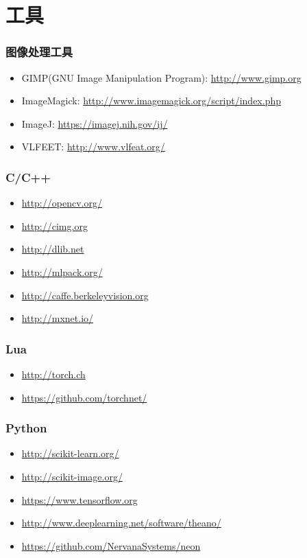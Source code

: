 \documentclass{beamer}
\begin{document}
\section{工具}
\label{sec-5}
\begin{frame}
\frametitle{图像处理工具}
\label{sec-5-1}

\begin{itemize}
\item GIMP(GNU Image Manipulation Program):  \href{http://www.gimp.org}{http://www.gimp.org}
\item ImageMagick:  \href{http://www.imagemagick.org/script/index.php}{http://www.imagemagick.org/script/index.php}
\item ImageJ:   \href{https://imagej.nih.gov/ij/}{https://imagej.nih.gov/ij/}
\item VLFEET: \href{http://www.vlfeat.org/}{http://www.vlfeat.org/}
\end{itemize}
\end{frame}
\begin{frame}
\frametitle{C/C++}
\label{sec-5-2}

\begin{itemize}
\item \href{http://opencv.org/}{http://opencv.org/}
\item \href{http://cimg.org}{http://cimg.org}
\item \href{http://dlib.net}{http://dlib.net}
\item \href{http://mlpack.org/}{http://mlpack.org/}
\item \href{http://caffe.berkeleyvision.org}{http://caffe.berkeleyvision.org}
\item \href{http://mxnet.io/}{http://mxnet.io/}
\end{itemize}
\end{frame}
\begin{frame}
\frametitle{Lua}
\label{sec-5-3}

\begin{itemize}
\item \href{http://torch.ch}{http://torch.ch}
\item \href{https://github.com/torchnet/}{https://github.com/torchnet/}
\end{itemize}
\end{frame}
\begin{frame}
\frametitle{Python}
\label{sec-5-4}

\begin{itemize}
\item \href{http://scikit-learn.org/}{http://scikit-learn.org/}
\item \href{http://scikit-image.org/}{http://scikit-image.org/}
\item \href{https://www.tensorflow.org}{https://www.tensorflow.org}
\item \href{http://www.deeplearning.net/software/theano/}{http://www.deeplearning.net/software/theano/}
\item \href{https://github.com/NervanaSystems/neon}{https://github.com/NervanaSystems/neon}
\end{itemize}
\end{frame}
\end{document}

